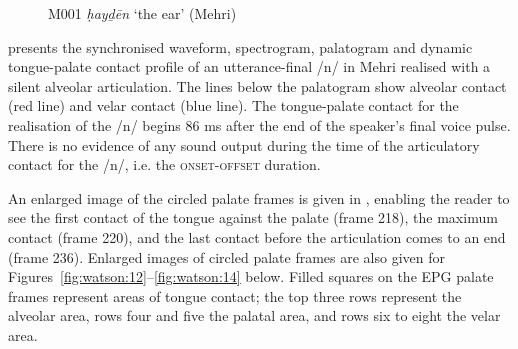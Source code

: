 \documentclass[output=paper]{langscibook}
\begin{document}
\begin{figure}[h]
\caption{\label{fig:watson:11} M001 \textit{ḥayḏēn} ‘the ear’ (Mehri)}
\end{figure}

 presents the synchronised waveform, spectrogram, palatogram and dynamic tongue-palate contact profile of an utterance-final \mbox{/n/} in Mehri realised with a silent alveolar articulation. The lines below the palatogram show alveolar contact (red line) and velar contact (blue line). The tongue-palate contact for the realisation of the \mbox{/n/} begins 86 ms after the end of the speaker’s final voice pulse. There is no evidence of any sound output during the time of the articulatory contact for the \mbox{/n/}, i.e. the \textsc{onset-offset} duration.

An enlarged image of the circled palate frames is given in , enabling the reader to see the first contact of the tongue against the palate (frame 218), the maximum contact (frame 220), and the last contact before the articulation comes to an end (frame 236). Enlarged images of circled palate frames are also given for Figures~\ref{fig:watson:12}–\ref{fig:watson:14} below. Filled squares on the EPG palate frames represent areas of tongue contact; the top three rows represent the alveolar area, rows four and five the palatal area, and rows six to eight the velar area.
\end{document}
